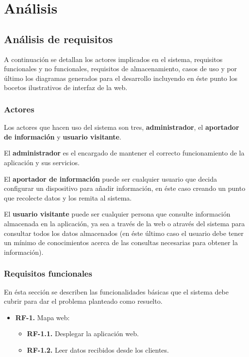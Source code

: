 \chapter{Análisis}

\section{Análisis de requisitos}

A continuación se detallan los actores implicados en el sistema, requisitos funcionales y no funcionales, requisitos de almacenamiento, casos de uso y por último los diagramas generados para el desarrollo incluyendo en éste punto los bocetos ilustrativos de interfaz de la web.

\subsection{Actores}

Los actores que hacen uso del sistema son tres, \textbf{administrador}, el \textbf{aportador de información} y \textbf{usuario visitante}.

\bigskip
El \textbf{administrador} es el encargado de mantener el correcto funcionamiento de la aplicación y sus servicios.

\bigskip
El \textbf{aportador de información} puede ser cualquier usuario que decida configurar un dispositivo para añadir información, en éste caso creando un punto que recolecte datos y los remita al sistema.

\bigskip
El \textbf{usuario visitante} puede ser cualquier persona que consulte información almacenada en la aplicación, ya sea a través de la web o através del sistema para consultar todos los datos almacenados (en éste último caso el usuario debe tener un mínimo de conocimientos acerca de las consultas necesarias para obtener la información).

\subsection{Requisitos funcionales}

En ésta sección se describen las funcionalidades básicas que el sistema debe cubrir para dar el problema planteado como resuelto.

\begin{itemize}
  \item \textbf{RF-1.} Mapa web:
    \begin{itemize}
    \item \textbf{RF-1.1.} Desplegar la aplicación web.
	\item \textbf{RF-1.2.} Leer datos recibidos desde los clientes.
    \end{itemize}
\end{itemize}

